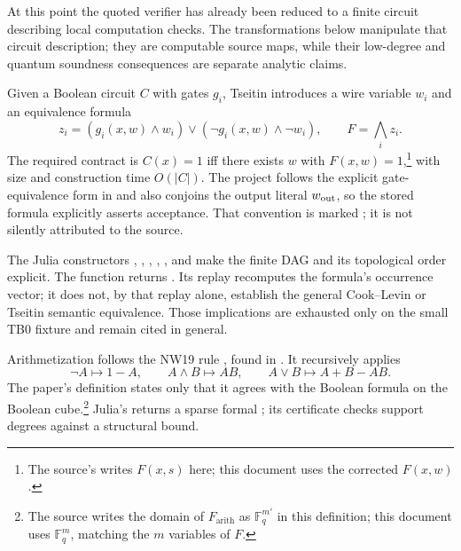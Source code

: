 \begin{reminder}
At this point the quoted verifier has already been reduced to a finite circuit
describing local computation checks.  The transformations below manipulate
that circuit description; they are computable source maps, while their
low-degree and quantum soundness consequences are separate analytic claims.
\end{reminder}

Given a Boolean circuit \(C\) with gates \(g_i\), Tseitin introduces a wire
variable \(w_i\) and an equivalence formula
\[
 z_i=(g_i(x,w)\wedge w_i)\vee
     (\neg g_i(x,w)\wedge\neg w_i),
 \qquad F=\bigwedge_i z_i.
\]
The required contract is
\(C(x)=1\) iff there exists \(w\) with \(F(x,w)=1\),\footnote{The source's  writes \(F(x,s)\) here; this document uses the corrected \(F(x,w)\).} with size and
construction time \(O(|C|)\).
The project follows the explicit gate-equivalence form in
 and also conjoins the output
literal \(w_{\rm out}\), so the stored formula explicitly asserts acceptance.
That convention is marked ; it is not silently attributed
to the source.

The Julia constructors , , ,
, , and  make the finite DAG and its
topological order explicit.  The function  returns
.  Its replay recomputes the formula's
occurrence vector; it does not, by that replay alone, establish the general
Cook--Levin or Tseitin semantic equivalence.  Those implications are exhausted
only on the small TB0 fixture and remain cited in general.

Arithmetization follows the NW19 rule , found in
.  It recursively applies
\[
  \neg A\mapsto 1-A,\qquad
  A\wedge B\mapsto AB,\qquad
  A\vee B\mapsto A+B-AB.
\]
The paper's definition states only that it agrees with the Boolean formula on the Boolean cube.\footnote{The source writes the domain of \(F_{\mathrm{arith}}\) as \(\mathbb F_q^{m'}\) in this definition; this document uses \(\mathbb F_q^{m}\), matching the \(m\) variables of \(F\).}
Julia's 
returns a sparse formal ; its  certificate checks
support degrees against a structural bound.


